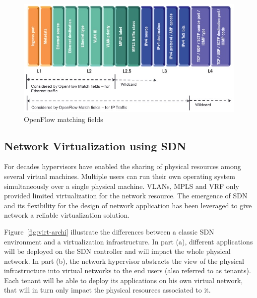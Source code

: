 \begin{figure}[h]
    \centering
    \includegraphics[scale=0.7]{figures/openflow-matchfields.png}
    \caption{OpenFlow matching fields~\cite{openflow-matchfields}}
    \label{fig:matching-fields}
\end{figure}

\subsection{Network Virtualization using SDN}
\label{def:netvirt}

For decades hypervisors have enabled the sharing of physical resources among several virtual machines.
Multiple users can run their own operating system simultaneously over a single physical machine.
VLANs, MPLS and VRF only provided limited virtualization for the network resource. The emergence of SDN and its flexibility for the design of network application has been leveraged to give network a reliable virtualization solution.

Figure~\ref{fig:virt-archi} illustrate the differences between a classic SDN environment and a virtualization infrastructure. In part (a), different applications will be deployed on the SDN controller and will impact the whole physical network.
In part (b), the network hypervisor abstracts the view of the physical infrastructure into virtual networks to the end users (also referred to as tenants).
Each tenant will be able to deploy its applications on his own virtual network, that will in turn only impact the physical resources associated to it.

